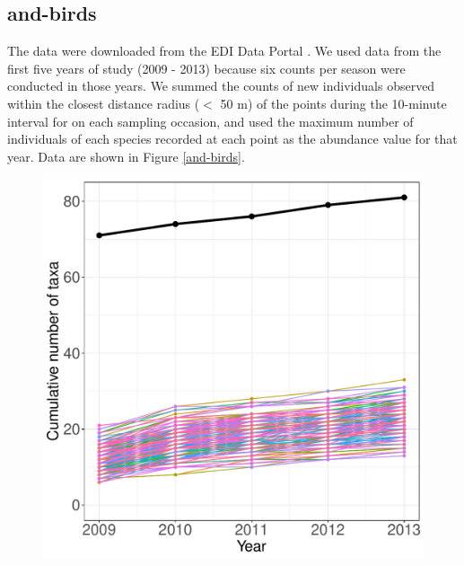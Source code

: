 \documentclass[11pt, oneside]{article}
\begin{document}
\subsection {and-birds}
The data were downloaded from the EDI Data Portal \citep{and-birds}.
We used data from the first five years of study (2009 - 2013) because six counts per season were conducted in those years.
We summed the counts of new individuals observed within the closest distance radius ($<$ 50 m)  of the points during the 10-minute interval for on each sampling occasion, and used the maximum number of individuals of each species recorded at each point as the abundance value for that year.
Data are shown in Figure \ref{and-birds}.

\begin{figure}[h!]
\centering
\includegraphics[scale = 0.4]{and-birds-wisnoski_species_accumulation_curve.pdf}

\end{figure}
\end{document}
